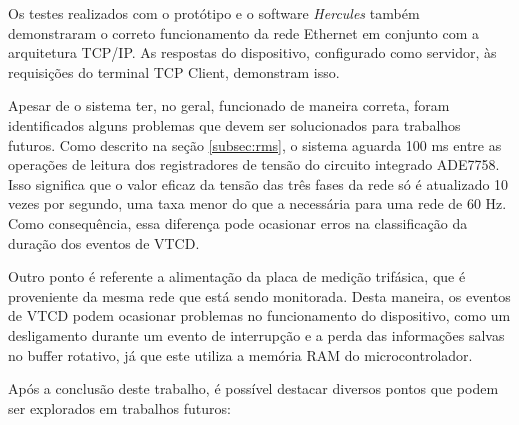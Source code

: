 Os testes realizados com o prot{\'o}tipo e o software \textit{Hercules} tamb{\'e}m demonstraram o correto funcionamento da rede Ethernet em conjunto com a arquitetura TCP/IP. As respostas do dispositivo, configurado como servidor, {\`a}s requisi{\c{c}}{\~o}es do terminal TCP Client, demonstram isso.

Apesar de o sistema ter, no geral, funcionado de maneira correta, foram identificados alguns problemas que devem ser solucionados para trabalhos futuros. Como descrito na se{\c{c}}{\~a}o \ref{subsec:rms}, o sistema aguarda 100 ms entre as opera{\c{c}}{\~o}es de leitura dos registradores de tens{\~a}o do circuito integrado ADE7758. Isso significa que o valor eficaz da tens{\~a}o das tr{\^e}s fases da rede s{\'o} {\'e} atualizado 10 vezes por segundo, uma taxa menor do que a necess{\'a}ria para uma rede de 60 Hz. Como consequ{\^e}ncia, essa diferen{\c{c}}a pode ocasionar erros na classifica{\c{c}}{\~a}o da dura{\c{c}}{\~a}o dos eventos de VTCD.

Outro ponto {\'e} referente a alimenta{\c{c}}{\~a}o da placa de medi{\c{c}}{\~a}o trif{\'a}sica, que {\'e} proveniente da mesma rede que est{\'a} sendo monitorada. Desta maneira, os eventos de VTCD podem ocasionar problemas no funcionamento do dispositivo, como um desligamento durante um evento de interrup{\c{c}}{\~a}o e a perda das informa{\c{c}}{\~o}es salvas no buffer rotativo, j{\'a} que este utiliza a mem{\'o}ria RAM do microcontrolador.

Ap{\'o}s a conclus{\~a}o deste trabalho, {\'e} poss{\'i}vel destacar diversos pontos que podem ser explorados em trabalhos futuros:

